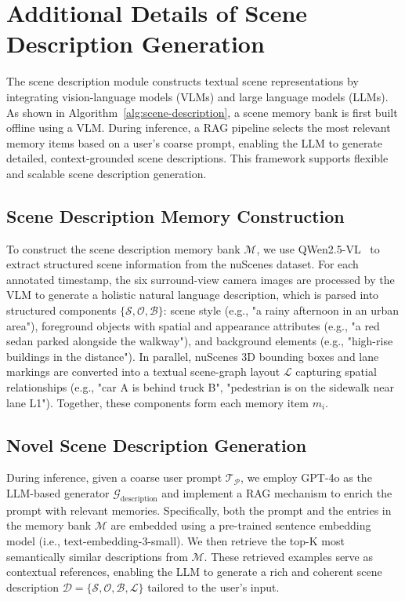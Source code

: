 

\section{Additional Details of Scene Description Generation}
\label{description}
The scene description module constructs textual scene representations by integrating vision-language models (VLMs) and large language models (LLMs). As shown in Algorithm~\ref{alg:scene-description}, a scene memory bank is first built offline using a VLM. During inference, a RAG pipeline selects the most relevant memory items based on a user's coarse prompt, enabling the LLM to generate detailed, context-grounded scene descriptions. This framework supports flexible and scalable scene description generation.

\subsection{Scene Description Memory Construction}
To construct the scene description memory bank $\mathcal{M}$, we use QWen2.5-VL~\cite{Qwen2.5-VL} to extract structured scene information from the nuScenes dataset. For each annotated timestamp, the six surround-view camera images are processed by the VLM to generate a holistic natural language description, which is parsed into structured components $\{\mathcal{S}, \mathcal{O}, \mathcal{B}\}$: scene style (e.g., "a rainy afternoon in an urban area"), foreground objects with spatial and appearance attributes (e.g., "a red sedan parked alongside the walkway"), and background elements (e.g., "high-rise buildings in the distance"). In parallel, nuScenes 3D bounding boxes and lane markings are converted into a textual scene-graph layout $\mathcal{L}$ capturing spatial relationships (e.g., "car A is behind truck B", "pedestrian is on the sidewalk near lane L1"). Together, these components form each memory item $m_i$.

\subsection{Novel Scene Description Generation}
During inference, given a coarse user prompt $\mathcal{T}_\mathcal{P}$, we employ GPT-4o as the LLM-based generator $\mathcal{G}_{\text{description}}$ and implement a RAG mechanism to enrich the prompt with relevant memories. Specifically, both the prompt and the entries in the memory bank $\mathcal{M}$ are embedded using a pre-trained sentence embedding model (i.e., text-embedding-3-small). We then retrieve the top-K most semantically similar descriptions from $\mathcal{M}$. These retrieved examples serve as contextual references, enabling the LLM to generate a rich and coherent scene description $\mathcal{D} = \{\mathcal{S}, \mathcal{O}, \mathcal{B}, \mathcal{L}\}$ tailored to the user’s input.


